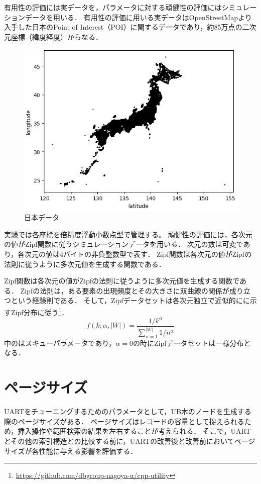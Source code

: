 有用性の評価には実データを，パラメータに対する頑健性の評価にはシミュレーションデータを用いる．
有用性の評価に用いる実データはOpenStreetMapより入手した日本のPoint of Interest（POI）に関するデータであり，約85万点の二次元座標（緯度経度）からなる．
\Fig{\ref{fig:japan}}
\begin{figure}[tb]
  \centering
  \includegraphics[scale=0.4]{./figures/japan.png}
  \caption{日本データ}
  \label{fig:japan}
\end{figure}
実験では各座標を倍精度浮動小数点型で管理する。
頑健性の評価には，各次元の値がZipf関数に従うシミュレーションデータを用いる．
次元の数は可変であり，各次元の値は4バイトの非負整数型で表す．
Zipf関数は各次元の値がZipfの法則に従うように多次元値を生成する関数である．

Zipf関数は各次元の値がZipfの法則に従うように多次元値を生成する関数である．
Zipfの法則は，ある要素の出現頻度とその大きさに双曲線の関係が成り立つという経験則である．
そして，Zipfデータセットは各次元独立で近似的に\Eq{\ref{eq:zipf}}に示すZipf分布に従う\footnote{\footnotesize\url{https://github.com/dbgroup-nagoya-u/cpp-utility}}．
\begin{equation}
  \label{eq:zipf}
  f(k; \alpha, |W|) = \frac{1 / k^{\alpha}}{\sum_{n = 1}^{|W|} 1 / n^{\alpha}}
\end{equation}
\Eq{\ref{eq:zipf}}中の\alpha はスキューパラメータであり，$\alpha = 0$の時にZipfデータセットは一様分布となる．

\section{ページサイズ}
UARTをチューニングするためのパラメータとして，UB木のノードを生成する際のページサイズがある．
ページサイズはレコードの容量として捉えられるため，挿入操作や範囲検索の結果を左右することが考えられる．
そこで，UARTとその他の索引構造との比較する前に，UARTの改善後と改善前においてページサイズが各性能に与える影響を評価する．

